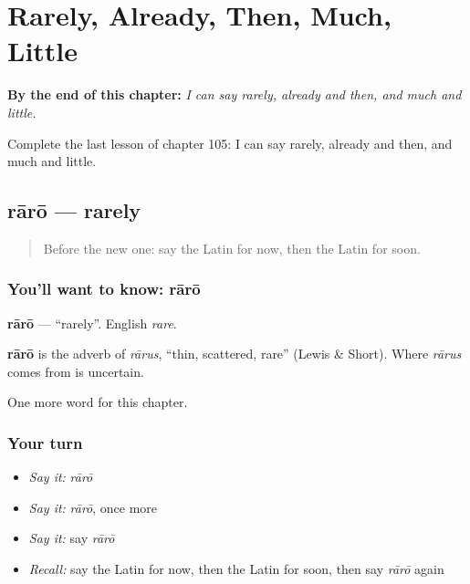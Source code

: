 
\chapter{Rarely, Already, Then, Much, Little}
\label{ch:la-rarely-already-then-much-little}

\begin{chapteropening}
\textbf{By the end of this chapter:} \emph{I can say rarely, already and then, and much and little.}

Complete the last lesson of chapter 105: I can say rarely, already and then, and much and little.
\end{chapteropening}

\section[rārō]{rārō — rarely}

\label{lesson:LA-C105-raro}



\begin{quote}
Before the new one: say the Latin for now, then the Latin for soon.
\end{quote}

\subsection*{You'll want to know: rārō}
\textbf{rārō} — \textquotedblleft{}rarely\textquotedblright{}. English \emph{rare}.

\begin{cousinweb}
\textbf{rārō} is the adverb of \emph{rārus}, \textquotedblleft{}thin, scattered, rare\textquotedblright{} (Lewis \& Short). Where \emph{rārus} comes from is uncertain.
\end{cousinweb}

\begin{grammarlens}[title={What you've built}]
One more word for this chapter.
\end{grammarlens}

\subsection*{Your turn}
\begin{itemize}
\raggedright
  \item \emph{Say it:} \emph{rārō}
  \item \emph{Say it:} \emph{rārō}, once more
  \item \emph{Say it:} say \emph{rārō}
  \item \emph{Recall:} say the Latin for now, then the Latin for soon, then say \emph{rārō} again
\end{itemize}

